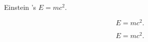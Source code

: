\documentclass{article}
\begin{document}
Einstein 's $E=mc^2$.

\[ E=mc^2. \]

\begin{equation}
E=mc^2.
\end{equation}
\end{document}
